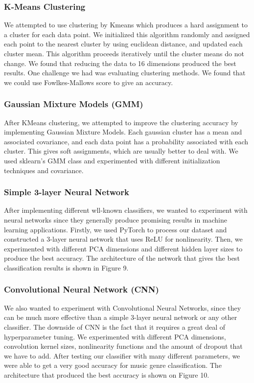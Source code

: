 \subsubsection{\textbf{K-Means Clustering}}
We attempted to use clustering by Kmeans which produces a hard assignment to a cluster for each data point. We initialized this algorithm randomly and assigned each point to the nearest cluster by using euclidean distance, and updated each cluster mean. This algorithm proceeds iteratively until the cluster means do not change. We found that reducing the data to 16 dimensions produced the best results. One challenge we had was evaluating clustering methods. We found that we could use Fowlkes-Mallows score to give an accuracy.

\subsubsection{\textbf{Gaussian Mixture Models (GMM)}}
After KMeans clustering, we attempted to improve the clustering accuracy by implementing Gaussian Mixture Models. Each gaussian cluster has a mean and associated covariance, and each data point has a probability associated with each cluster. This gives soft assignments, which are usually better to deal with. We used sklearn's GMM class and experimented with different initialization techniques and covariance. 

\subsubsection{\textbf{Simple 3-layer Neural Network}}
After implementing different wll-known classifiers, we wanted to experiment with neural networks since they generally produce promising results in machine learning applications. Firstly, we used PyTorch to process our dataset and constructed a 3-layer neural network that uses ReLU for nonlinearity. Then, we experimented with different PCA dimensions and different hidden layer sizes to produce the best accuracy. The architecture of the network that gives the best classification results is shown in Figure 9. 


\subsubsection{\textbf{Convolutional Neural Network (CNN)}}
We also wanted to experiment with Convolutional Neural Networks, since they can be much more effective than a simple 3-layer neural network or any other classifier. The downside of CNN is the fact that it requires a great deal of hyperparameter tuning. We experimented with different PCA dimensions, convolution kernel sizes, nonlinearity functions and the amount of dropout that we have to add. After testing our classifier with many different parameters, we were able to get a very good accuracy for music genre classification. The architecture that produced the best accuracy is shown on Figure 10. 

